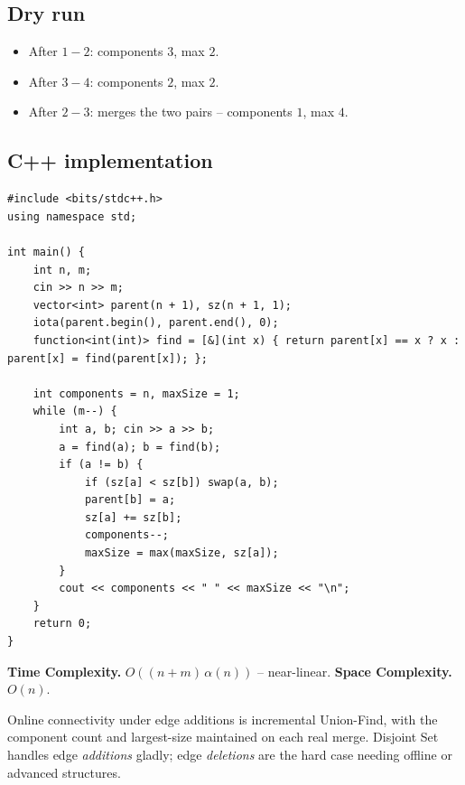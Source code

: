 \subsection*{Dry run}


\begin{itemize}
  \item After $1\!-\!2$: components $3$, max $2$.
  \item After $3\!-\!4$: components $2$, max $2$.
  \item After $2\!-\!3$: merges the two pairs -- components $1$, max $4$.
\end{itemize}

\subsection*{C++ implementation}

\begin{lstlisting}
#include <bits/stdc++.h>
using namespace std;

int main() {
    int n, m;
    cin >> n >> m;
    vector<int> parent(n + 1), sz(n + 1, 1);
    iota(parent.begin(), parent.end(), 0);
    function<int(int)> find = [&](int x) { return parent[x] == x ? x : parent[x] = find(parent[x]); };

    int components = n, maxSize = 1;
    while (m--) {
        int a, b; cin >> a >> b;
        a = find(a); b = find(b);
        if (a != b) {
            if (sz[a] < sz[b]) swap(a, b);
            parent[b] = a;
            sz[a] += sz[b];
            components--;
            maxSize = max(maxSize, sz[a]);
        }
        cout << components << " " << maxSize << "\n";
    }
    return 0;
}
\end{lstlisting}

\begin{complexitybox}
\textbf{Time Complexity.} $O((n+m)\,\alpha(n))$ -- near-linear.
\textbf{Space Complexity.} $O(n)$.
\end{complexitybox}

\begin{takeawaybox}
Online connectivity under edge additions is incremental Union-Find, with the
component count and largest-size maintained on each real merge. Disjoint Set
handles edge \emph{additions} gladly; edge \emph{deletions} are the hard
case needing offline or advanced structures.
\end{takeawaybox}

